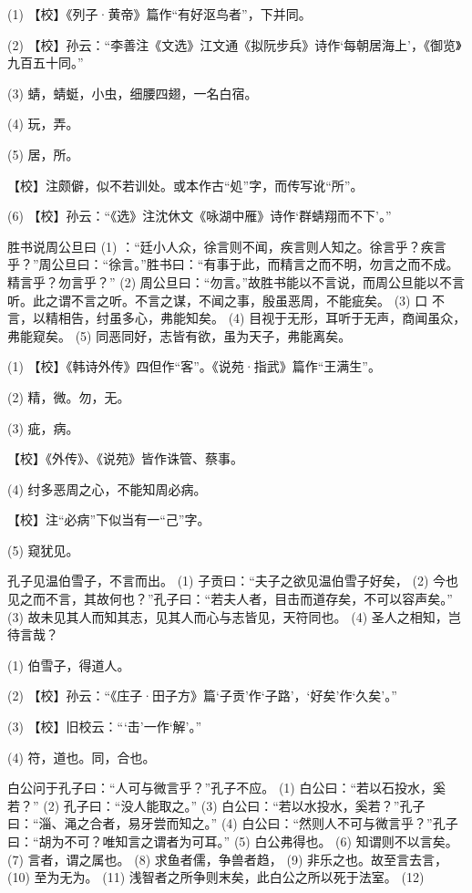 \documentclass[12pt,UTF8]{ctexbook}
\begin{document}
(1) 【校】《列子·黄帝》篇作“有好沤鸟者”，下并同。

(2) 【校】孙云：“李善注《文选》江文通《拟阮步兵》诗作‘每朝居海上’，《御览》九百五十同。”

(3) 蜻，蜻蜓，小虫，细腰四翅，一名白宿。

(4) 玩，弄。

(5) 居，所。

【校】注颇僻，似不若训处。或本作古“処”字，而传写讹“所”。

(6) 【校】孙云：“《选》注沈休文《咏湖中雁》诗作‘群蜻翔而不下’。”

胜书说周公旦曰 (1) ：“廷小人众，徐言则不闻，疾言则人知之。徐言乎？疾言乎？”周公旦曰：“徐言。”胜书曰：“有事于此，而精言之而不明，勿言之而不成。精言乎？勿言乎？” (2) 周公旦曰：“勿言。”故胜书能以不言说，而周公旦能以不言听。此之谓不言之听。不言之谋，不闻之事，殷虽恶周，不能疵矣。 (3) 口 不言，以精相告，纣虽多心，弗能知矣。 (4) 目视于无形，耳听于无声，商闻虽众，弗能窥矣。 (5) 同恶同好，志皆有欲，虽为天子，弗能离矣。

(1) 【校】《韩诗外传》四但作“客”。《说苑·指武》篇作“王满生”。

(2) 精，微。勿，无。

(3) 疵，病。

【校】《外传》、《说苑》皆作诛管、蔡事。

(4) 纣多恶周之心，不能知周必病。

【校】注“必病”下似当有一“己”字。

(5) 窥犹见。

孔子见温伯雪子，不言而出。 (1) 子贡曰：“夫子之欲见温伯雪子好矣， (2) 今也见之而不言，其故何也？”孔子曰：“若夫人者，目击而道存矣，不可以容声矣。” (3) 故未见其人而知其志，见其人而心与志皆见，天符同也。 (4) 圣人之相知，岂待言哉？

(1) 伯雪子，得道人。

(2) 【校】孙云：“《庄子·田子方》篇‘子贡’作‘子路’，‘好矣’作‘久矣’。”

(3) 【校】旧校云：“‘击’一作‘解’。”

(4) 符，道也。同，合也。

白公问于孔子曰：“人可与微言乎？”孔子不应。 (1) 白公曰：“若以石投水，奚若？” (2) 孔子曰：“没人能取之。” (3) 白公曰：“若以水投水，奚若？”孔子曰：“淄、渑之合者，易牙尝而知之。” (4) 白公曰：“然则人不可与微言乎？”孔子曰：“胡为不可？唯知言之谓者为可耳。” (5) 白公弗得也。 (6) 知谓则不以言矣。 (7) 言者，谓之属也。 (8) 求鱼者儒，争兽者趋， (9) 非乐之也。故至言去言， (10) 至为无为。 (11) 浅智者之所争则末矣，此白公之所以死于法室。 (12)
\end{document}
